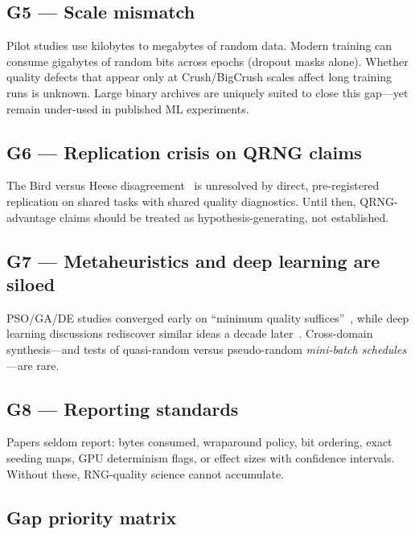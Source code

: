\subsection{G5 --- Scale mismatch}

Pilot studies use kilobytes to megabytes of random data.
Modern training can consume gigabytes of random bits across epochs (dropout masks alone).
Whether quality defects that appear only at Crush/BigCrush scales affect long training runs is unknown.
Large binary archives are uniquely suited to close this gap---yet remain under-used in published ML experiments.

\subsection{G6 --- Replication crisis on QRNG claims}

The Bird versus Heese disagreement~\cite{bird2019softcomputing,heese2024biased} is unresolved by direct, pre-registered replication on shared tasks with shared quality diagnostics.
Until then, QRNG-advantage claims should be treated as hypothesis-generating, not established.

\subsection{G7 --- Metaheuristics and deep learning are siloed}

PSO/GA/DE studies converged early on ``minimum quality suffices''~\cite{bastos2009pso,ma2014comparison}, while deep learning discussions rediscover similar ideas a decade later~\cite{antunes2025influence}.
Cross-domain synthesis---and tests of quasi-random versus pseudo-random \emph{mini-batch schedules}---are rare.

\subsection{G8 --- Reporting standards}

Papers seldom report: bytes consumed, wraparound policy, bit ordering, exact seeding maps, GPU determinism flags, or effect sizes with confidence intervals.
Without these, RNG-quality science cannot accumulate.

\subsection{Gap priority matrix}

